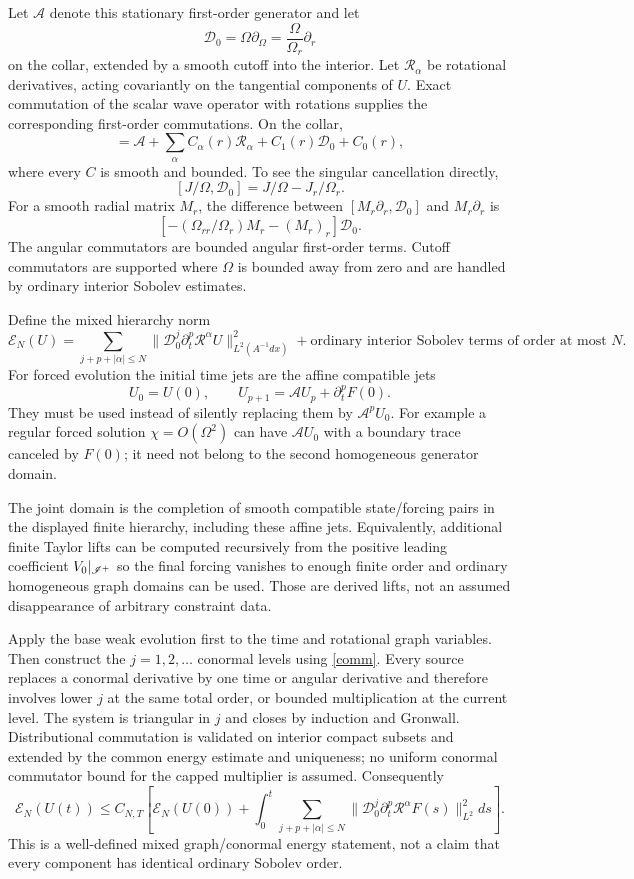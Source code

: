 Let $\mathcal A$ denote this stationary first-order generator and let
\[
 \mathcal D_0=\Omega\partial_\Omega=\frac{\Omega}{\Omega_r}\partial_r
\]
on the collar, extended by a smooth cutoff into the interior. Let $\mathcal R_\alpha$ be rotational derivatives, acting covariantly on the tangential components of $U$. Exact commutation of the scalar wave operator with rotations supplies the corresponding first-order commutations. On the collar,
\begin{equation}
 [\mathcal A,\mathcal D_0]
 =\mathcal A+\sum_\alpha C_\alpha(r)\mathcal R_\alpha
 +C_1(r)\mathcal D_0+C_0(r),\label{comm}
\end{equation}
where every $C$ is smooth and bounded. To see the singular cancellation directly,
\[
 [J/\Omega,\mathcal D_0]=J/\Omega-J_r/\Omega_r.
\]
For a smooth radial matrix $M_r$, the difference between
$[M_r\partial_r,\mathcal D_0]$ and $M_r\partial_r$ is
\[
 \left[-(\Omega_{rr}/\Omega_r)M_r-(M_r)_r\right]\mathcal D_0.
\]
The angular commutators are bounded angular first-order terms. Cutoff commutators are supported where $\Omega$ is bounded away from zero and are handled by ordinary interior Sobolev estimates.

Define the mixed hierarchy norm
\[
 \mathcal E_N(U)=
 \sum_{j+p+|\alpha|\le N}
 \|\mathcal D_0^j\partial_t^p\mathcal R^\alpha U\|_{L^2(A^{-1}dx)}^2
 +\text{ordinary interior Sobolev terms of order at most }N.
\]
For forced evolution the initial time jets are the affine compatible jets
\[
 U_0=U(0),\qquad U_{p+1}=\mathcal A U_p+\partial_t^pF(0).
\]
They must be used instead of silently replacing them by $\mathcal A^pU_0$. For example a regular forced solution $\chi=O(\Omega^2)$ can have $\mathcal AU_0$ with a boundary trace canceled by $F(0)$; it need not belong to the second homogeneous generator domain.

The joint domain is the completion of smooth compatible state/forcing pairs in the displayed finite hierarchy, including these affine jets. Equivalently, additional finite Taylor lifts can be computed recursively from the positive leading coefficient $V_0|_{\mathscr I^+}$ so the final forcing vanishes to enough finite order and ordinary homogeneous graph domains can be used. Those are derived lifts, not an assumed disappearance of arbitrary constraint data.

Apply the base weak evolution first to the time and rotational graph variables. Then construct the $j=1,2,\ldots$ conormal levels using \eqref{comm}. Every source replaces a conormal derivative by one time or angular derivative and therefore involves lower $j$ at the same total order, or bounded multiplication at the current level. The system is triangular in $j$ and closes by induction and Gronwall. Distributional commutation is validated on interior compact subsets and extended by the common energy estimate and uniqueness; no uniform conormal commutator bound for the capped multiplier is assumed. Consequently
\[
 \mathcal E_N(U(t))\le C_{N,T}\left[
 \mathcal E_N(U(0))+
 \int_0^t\sum_{j+p+|\alpha|\le N}
 \|\mathcal D_0^j\partial_t^p\mathcal R^\alpha F(s)\|_{L^2}^2ds
 \right].
\]
This is a well-defined mixed graph/conormal energy statement, not a claim that every component has identical ordinary Sobolev order.

